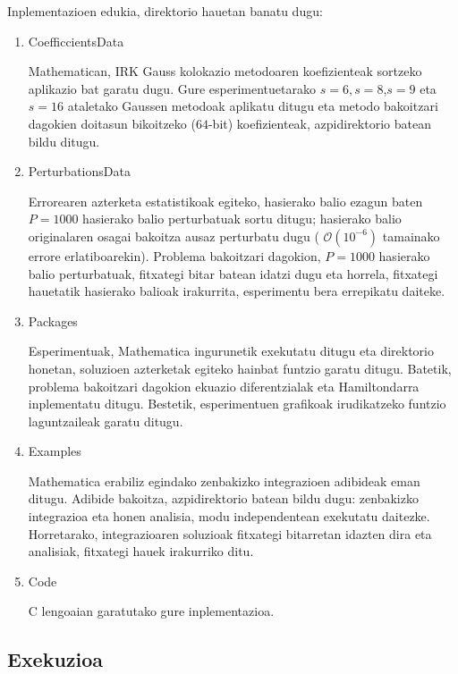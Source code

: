 Inplementazioen edukia, direktorio hauetan banatu dugu:
\begin{enumerate}

\item CoefficcientsData

Mathematican, IRK Gauss kolokazio metodoaren koefizienteak sortzeko aplikazio bat garatu dugu. Gure esperimentuetarako $s=6,s=8$,$s=9$ eta $s=16$ ataletako Gaussen metodoak aplikatu ditugu eta metodo bakoitzari dagokien doitasun bikoitzeko ($64$-bit) koefizienteak, azpidirektorio batean bildu ditugu.

\item PerturbationsData

Errorearen azterketa estatistikoak egiteko, hasierako balio ezagun baten $P=1000$ hasierako balio perturbatuak sortu ditugu; hasierako balio originalaren osagai bakoitza ausaz perturbatu dugu ( $\mathcal{O}(10^{-6})$ tamainako errore erlatiboarekin). Problema bakoitzari dagokion, $P=1000$ hasierako balio perturbatuak, fitxategi bitar batean idatzi dugu eta horrela, fitxategi hauetatik hasierako balioak  irakurrita, esperimentu bera errepikatu daiteke.

\item Packages

Esperimentuak, Mathematica ingurunetik exekutatu ditugu eta direktorio honetan, soluzioen azterketak egiteko hainbat funtzio garatu ditugu. Batetik, problema bakoitzari dagokion ekuazio diferentzialak eta Hamiltondarra inplementatu ditugu. Bestetik, esperimentuen grafikoak irudikatzeko funtzio laguntzaileak garatu ditugu. 

\item Examples

Mathematica erabiliz egindako zenbakizko integrazioen adibideak eman ditugu. Adibide bakoitza, azpidirektorio batean bildu dugu: zenbakizko integrazioa eta honen analisia, modu independentean exekutatu daitezke. Horretarako, integrazioaren soluzioak fitxategi bitarretan idazten dira eta analisiak, fitxategi hauek irakurriko ditu.       

\item Code

C lengoaian garatutako gure inplementazioa. 

\end{enumerate}

\subsection*{Exekuzioa}

